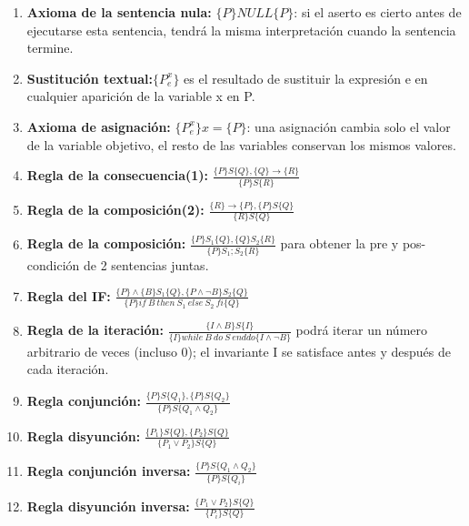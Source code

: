 \documentclass[a4paper,11pt]{article}
\begin{document}
\begin{enumerate}
\item \textbf{Axioma de la sentencia nula:} $\{P\} NULL \{P\}$: si el aserto es cierto antes de ejecutarse esta sentencia, tendrá la misma interpretación cuando la sentencia termine.

\item \textbf{Sustitución textual:}$\{P^x_e\}$ es el resultado de sustituir la expresión e en cualquier aparición de la variable x en P.

\item \textbf{Axioma de asignación:} $\{P^x_e\}x = \{P\}$: una asignación cambia solo el valor de la variable objetivo, el resto de las variables conservan los mismos valores.

\item \textbf{Regla de la consecuencia(1):} $\frac{\{P\}S\{Q\}, \{Q\} \rightarrow \{R\}}{\{P\}S\{R\}}$

\item \textbf{Regla de la composición(2):} $\frac{\{R\}\rightarrow \{P\},\{P\}S\{Q\}}{\{R\}S\{Q\}}$

\item \textbf{Regla de la composición:} $\frac{\{P\}S_1\{Q\},\{Q\}S_2\{R\}}{\{P\}S_1;S_2\{R\}}$ para obtener la pre y pos-condición de 2 sentencias juntas.

\item \textbf{Regla del IF:} $\frac{\{P\}\wedge\{B\}S_1\{Q\},\{P\wedge \neg B\}S_2\{Q\}}{\{P\}if \> B \> then \> S_1 \> else \> S_2 \> fi\{Q\}}$

\item \textbf{Regla de la iteración:} $\frac{\{I\wedge B\}S\{I\}}{\{I\}while \> B \> do \> S \> enddo \{I\wedge \neg B\}}$ podrá iterar un número arbitrario de veces (incluso 0); el invariante I se satisface antes y después de cada iteración.

\item \textbf{Regla conjunción:} $\frac{\{P\}S\{Q_1\}, \{P\}S\{Q_2\}}{\{P\}S\{Q_1\wedge Q_2\}}$

\item \textbf{Regla disyunción:} $\frac{\{P_1\}S\{Q\}, \{P_2\}S\{Q\}}{\{P_1 \lor P_2\}S\{Q\}}$

\item \textbf{Regla conjunción inversa:} $\frac{\{P\}S\{Q_1 \wedge Q_2\}}{\{P\}S\{Q_i\}}$

\item \textbf{Regla disyunción inversa:} $\frac{\{P_1 \lor P_2\}S\{Q\}}{\{P_i\}S\{Q\}}$
\end{enumerate}
\end{document}

